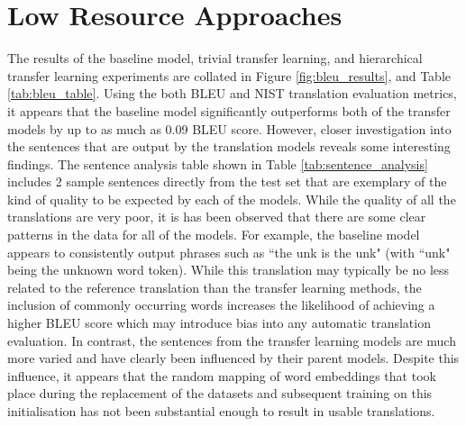 \section{Low Resource Approaches}




The results of the baseline model, trivial transfer learning, and hierarchical transfer learning experiments are collated in Figure \ref{fig:bleu_results}, and Table \ref{tab:bleu_table}. Using the both \acrshort{BLEU} and \acrshort{NIST} translation evaluation metrics, it appears that the baseline model significantly outperforms both of the transfer models by up to as much as 0.09 \acrshort{BLEU} score. However, closer investigation into the sentences that are output by the translation models reveals some interesting findings. The sentence analysis table shown in Table \ref{tab:sentence_analysis} includes 2 sample sentences directly from the test set that are exemplary of the kind of quality to be expected by each of the models. While the quality of all the translations are very poor, it is has been observed that there are some clear patterns in the data for all of the models. For example, the baseline model appears to consistently output phrases such as ``the unk is the unk" (with ``unk" being the unknown word token). While this translation may typically be no less related to the reference translation than the transfer learning methods, the inclusion of commonly occurring words increases the likelihood of achieving a higher \acrshort{BLEU} score which may introduce bias into any automatic translation evaluation. In contrast, the sentences from the transfer learning models are much more varied and have clearly been influenced by their parent models. Despite this influence, it appears that the random mapping of word embeddings that took place during the replacement of the datasets and subsequent training on this initialisation has not been substantial enough to result in usable translations. 


